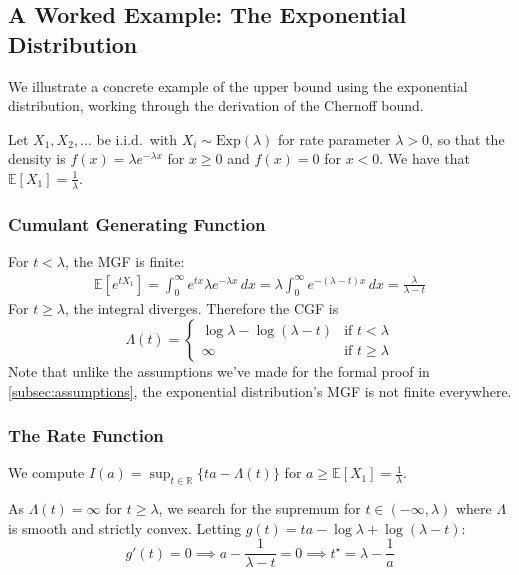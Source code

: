 \documentclass{article}
\newcommand{\E}{\mathbb{E}}
\newcommand{\R}{\mathbb{R}}
\begin{document}
\subsection{A Worked Example: The Exponential Distribution}
\label{subsec:worked-example}

We illustrate a concrete example of the upper bound using the exponential distribution, working
through the derivation of the Chernoff bound.

Let $X_1, X_2, \dots$ be i.i.d.\ with $X_i \sim \text{Exp}(\lambda)$ for rate parameter
$\lambda > 0$, so that the density is $f(x) = \lambda e^{-\lambda x}$ for $x \ge 0$ and
$f(x) = 0$ for $x < 0$. We have that $\E[X_1] = \frac{1}{\lambda}$.

\subsubsection{Cumulant Generating Function}
For $t < \lambda$, the MGF is finite:
\begin{align}
  \E[e^{tX_1}] = \int_{0}^{\infty} e^{tx} \lambda e^{-\lambda x} \, dx
  = \lambda \int_{0}^{\infty} e^{-(\lambda - t)x} \, dx
  = \frac{\lambda}{\lambda - t}
\end{align}
For $t \ge \lambda$, the integral diverges. Therefore the CGF is
\begin{equation}
  \Lambda(t) =
  \begin{cases}
    \log \lambda - \log(\lambda - t) & \text{if } t < \lambda \\
    \infty & \text{if } t \ge \lambda
  \end{cases}
\end{equation}
Note that unlike the assumptions we've made for the formal proof in
\cref{subsec:assumptions}, the exponential distribution's MGF is not finite everywhere.

\subsubsection{The Rate Function}
We compute $I(a) = \sup_{t \in \R} \{ ta - \Lambda(t) \}$ for $a \ge \E[X_1] = \frac{1}{\lambda}$.

As $\Lambda(t) = \infty$ for $t \ge \lambda$, we search for the supremum for
$t \in (-\infty, \lambda)$ where $\Lambda$ is smooth and strictly convex.
Letting $g(t) = ta - \log \lambda + \log(\lambda - t)$:
\begin{equation}
  g'(t) = 0 \implies a - \frac{1}{\lambda - t} = 0 \implies t^\star = \lambda - \frac{1}{a}
\end{equation}
\end{document}
